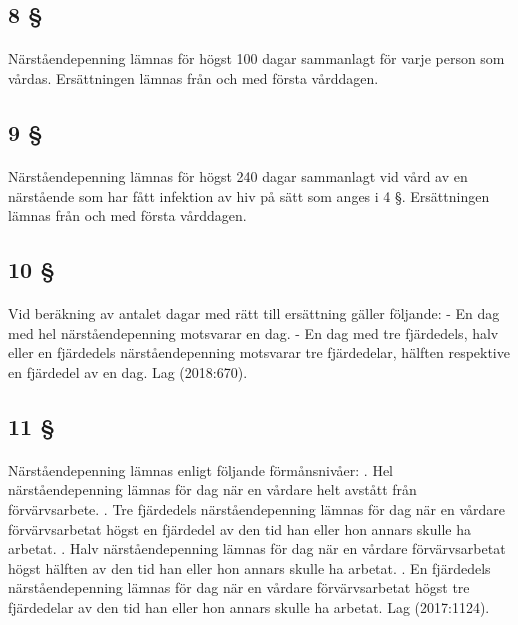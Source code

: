 \documentclass[a4paper,notitlepage,openany,10pt]{book}
\begin{document}
\subsection*{8 §}
\paragraph*{}
Närståendepenning lämnas för högst 100 dagar sammanlagt för varje person som vårdas. Ersättningen lämnas från och med första vårddagen.
\subsection*{9 §}
\paragraph*{}
Närståendepenning lämnas för högst 240 dagar sammanlagt vid vård av en närstående som har fått infektion av hiv på sätt som anges i 4 §. Ersättningen lämnas från och med första vårddagen.
\subsection*{10 §}
\paragraph*{}
Vid beräkning av antalet dagar med rätt till ersättning gäller följande:
\newline - En dag med hel närståendepenning motsvarar en dag.
\newline - En dag med tre fjärdedels, halv eller en fjärdedels närståendepenning motsvarar tre fjärdedelar, hälften respektive en fjärdedel av en dag.
Lag (2018:670).
\subsection*{11 §}
\paragraph*{}
Närståendepenning lämnas enligt följande förmånsnivåer:
. Hel närståendepenning lämnas för dag när en vårdare helt avstått från förvärvsarbete.
. Tre fjärdedels närståendepenning lämnas för dag när en vårdare förvärvsarbetat högst en fjärdedel av den tid han eller hon annars skulle ha arbetat.
. Halv närståendepenning lämnas för dag när en vårdare förvärvsarbetat högst hälften av den tid han eller hon annars skulle ha arbetat.
. En fjärdedels närståendepenning lämnas för dag när en vårdare förvärvsarbetat högst tre fjärdedelar av den tid han eller hon annars skulle ha arbetat.
Lag (2017:1124).
\end{document}
